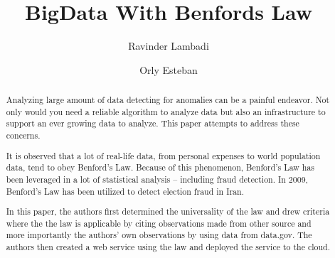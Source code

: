 


\def\paperstatus{80} %
\def\paperchapter{REST} %
\def\hid{hid-sp18-514, hid-sp18-506} %
\def\volume{9} %

\def\locator{\hid, Volume: \volume, Chapter: \paperchapter, Status: \paperstatus. \newline}


\title{BigData With Benfords Law}

\author{Ravinder Lambadi}


\author{Orly Esteban}

\begin{abstract}
Analyzing large amount of data detecting for anomalies 
can be a painful endeavor. Not only would you need a 
reliable algorithm to analyze data but also an 
infrastructure to support an ever growing data to 
analyze. This paper attempts to address these concerns. 

It is observed that a lot of real-life data, 
from personal expenses to world population data, 
tend to obey Benford’s Law. Because of this phenomenon, 
Benford’s Law has been leveraged 
in a lot of statistical analysis – including fraud 
detection. In 2009,  Benford’s Law has been utilized 
to detect election fraud in Iran.

In this paper, the authors first determined 
the universality of the law and drew criteria 
where the the law is applicable by citing 
observations made from other source and more 
importantly the authors’ own observations by 
using data from data.gov. The authors then 
created a web service using the law and deployed 
the service to the cloud.

\end{abstract}

